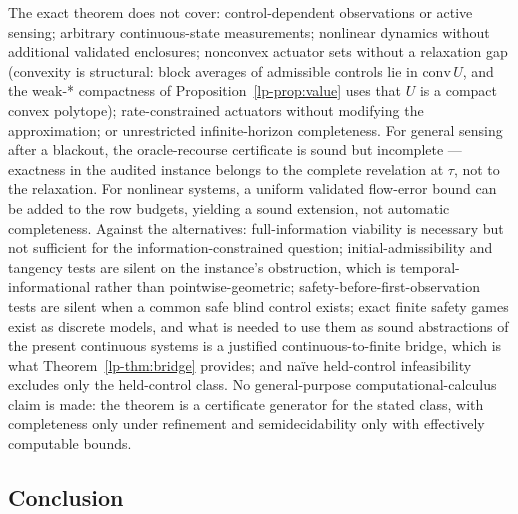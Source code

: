\documentclass[10pt,twocolumn]{article}
\theoremstyle{plain}
\theoremstyle{definition}
\theoremstyle{remark}
\begin{document}
The exact theorem does not cover: control-dependent observations or active
sensing; arbitrary continuous-state measurements; nonlinear dynamics without
additional validated enclosures; nonconvex actuator sets without a relaxation gap (convexity is
structural: block averages of admissible controls lie in
\(\mathrm{conv}\,U\), and the weak-* compactness of
Proposition~\ref{lp-prop:value} uses that \(U\) is a compact convex
polytope); rate-constrained actuators without modifying the
approximation; or unrestricted infinite-horizon completeness. For general
sensing after a blackout, the oracle-recourse certificate is sound but
incomplete --- exactness in the audited instance belongs to the complete
revelation at \(\tau\), not to the relaxation. For nonlinear systems, a uniform validated flow-error bound can
be added to the row budgets, yielding a sound extension, not automatic
completeness. Against the alternatives: full-information viability is necessary but not sufficient for the
information-constrained question; initial-admissibility and tangency tests
are silent on the instance's obstruction, which is temporal-informational
rather than pointwise-geometric; safety-before-first-observation tests are
silent when a common safe blind control exists; exact finite safety games
exist as discrete models, and what is needed to use them as sound
abstractions of the present continuous systems is a justified
continuous-to-finite bridge, which is what Theorem~\ref{lp-thm:bridge}
provides; and na\"ive held-control infeasibility
excludes only the held-control class. No general-purpose
computational-calculus claim is made: the theorem is a certificate generator
for the stated class, with completeness only under refinement and
semidecidability only with effectively computable bounds.

\subsection{
Conclusion}\label{lp-conclusion}
\end{document}
